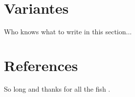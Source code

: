 \documentclass[fleqn,10pt]{SelfArx} %
\begin{document}
\lipsum[16] %


\section{Variantes} 
Who knows what to write in this section... 

\lipsum[17] %

\section*{References} %


So long and thanks for all the fish \cite{Figueredo:2009dg}.
\lipsum[18] %




\end{document}
